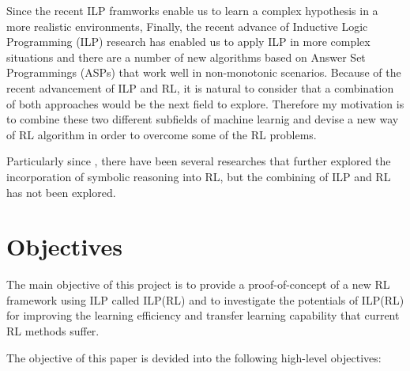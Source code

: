 Since the recent ILP framworks enable us to learn a complex hypothesis in a more realistic environments, 
Finally, the recent advance of Inductive Logic Programming (ILP) research has enabled us to apply ILP in more complex situations and there are a number of new algorithms based on Answer Set Programmings (ASPs) that work well in non-monotonic scenarios.
Because of the recent advancement of ILP and RL, it is natural to consider that a combination of both approaches would be the next field to explore.
Therefore my motivation is to combine these two different subfields of machine learnig and devise a new way of RL algorithm in order to overcome some of the RL problems.

Particularly since \cite{Garnelo2016}, there have been several researches that further explored the incorporation of symbolic reasoning into RL, but the combining of ILP and RL has not been explored. 

\section{Objectives}
\label{sec:objectives}

The main objective of this project is to provide a proof-of-concept of a new RL framework using ILP called ILP(RL) and to investigate the potentials of ILP(RL) for improving the learning efficiency and transfer learning capability that current RL methods suffer.

The objective of this paper is devided into the following high-level objectives: 

